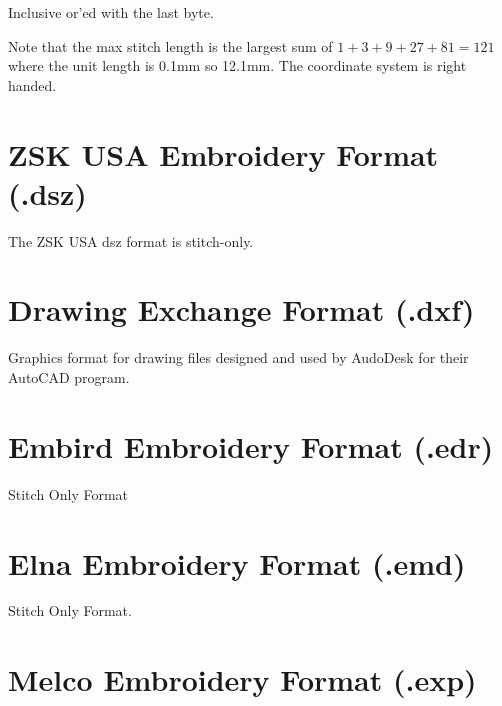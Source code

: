 Inclusive or'ed with the last byte.

Note that the max stitch length is the largest sum of $1+3+9+27+81=121$ where the unit length is 0.1mm so 12.1mm. The coordinate system is right handed.

\section{ZSK USA Embroidery Format (.dsz)}

The ZSK USA dsz format is stitch-only.

\section{Drawing Exchange Format (.dxf)}

Graphics format for drawing files designed and used by AudoDesk for their AutoCAD program. \cite{dxf_reference}

\section{Embird Embroidery Format (.edr)}

Stitch Only Format

\section{Elna Embroidery Format (.emd)}

Stitch Only Format.

\section{Melco Embroidery Format (.exp)}

Stitch Only Format.

\section{Eltac Embroidery Format (.exy)}

Stitch Only Format.

\section{Sierra Expanded Embroidery Format (.eys)}

